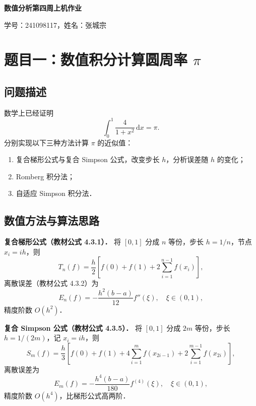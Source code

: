 \documentclass[UTF8,a4paper,11pt]{article}
\begin{document}
\begin{center}
{\huge \textbf{数值分析第四周上机作业}}

\vspace{0.3cm}
{\large 学号：241098117\quad，姓名：张城宗\quad}
\end{center}

\section{题目一：数值积分计算圆周率 $\pi$}

\subsection{问题描述}

数学上已经证明
$$\int_0^1 \frac{4}{1+x^2}\,\mathrm{d}x = \pi.$$
分别实现以下三种方法计算 $\pi$ 的近似值：
\begin{enumerate}[label=(\arabic*)]
  \item 复合梯形公式与复合 Simpson 公式，改变步长 $h$，分析误差随 $h$ 的变化；
  \item Romberg 积分法；
  \item 自适应 Simpson 积分法．
\end{enumerate}

\subsection{数值方法与算法思路}

\noindent\textbf{复合梯形公式（教材公式 4.3.1）．}
将 $[0,1]$ 分成 $n$ 等份，步长 $h = 1/n$，节点 $x_i = ih$，则
$$T_n(f) = \frac{h}{2}\left[f(0) + f(1) + 2\sum_{i=1}^{n-1}f(x_i)\right],$$
离散误差（教材公式 4.3.2）为
$$E_n(f) = -\frac{h^2(b-a)}{12}f''(\xi),\quad \xi\in(0,1),$$
精度阶数 $O(h^2)$．

\noindent\textbf{复合 Simpson 公式（教材公式 4.3.5）．}
将 $[0,1]$ 分成 $2m$ 等份，步长 $h=1/(2m)$，记 $x_i = ih$，则
$$S_m(f) = \frac{h}{3}\left[f(0)+f(1)+4\sum_{i=1}^{m}f(x_{2i-1})+2\sum_{i=1}^{m-1}f(x_{2i})\right],$$
离散误差为
$$E_m(f) = -\frac{h^4(b-a)}{180}f^{(4)}(\xi),\quad \xi\in(0,1),$$
精度阶数 $O(h^4)$，比梯形公式高两阶．
\end{document}
